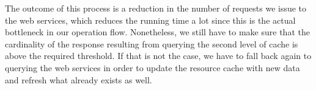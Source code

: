 The outcome of this process is a reduction in the number of requests we issue to the web services, which reduces the running time a lot since this is the actual bottleneck in our operation flow. Nonetheless, we still have to make sure that the cardinality of the response resulting from querying the second level of cache is above the required threshold. If that is not the case, we have to fall back again to querying the web services in order to update the resource cache with new data and refresh what already exists as well.